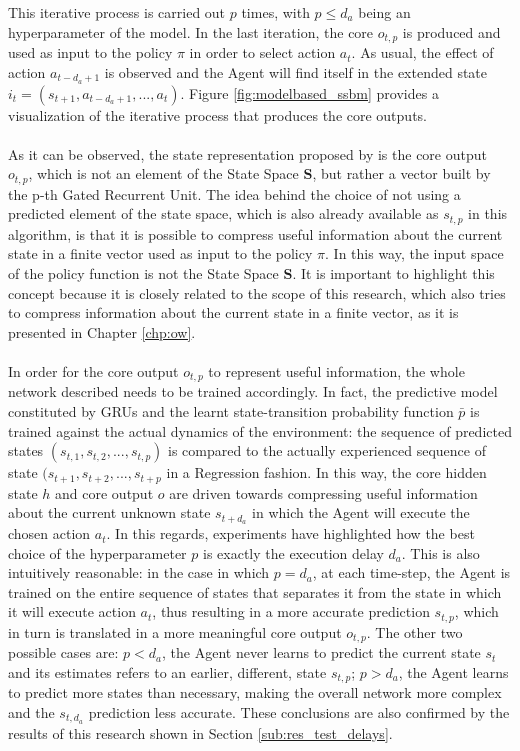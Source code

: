                 This iterative process is carried out $p$ times, with $p \leq d_a$ being an hyperparameter of the model. In the last iteration, the core $o_{t, p}$ is produced and used as input to the policy $\pi$ in order to select action $a_t$. As usual, the effect of action $a_{t-d_a+1}$ is observed and the Agent will find itself in the extended state $i_t = \left( s_{t+1}, a_{t-d_a+1},..., a_{t}\right)$. Figure \ref{fig:modelbased_ssbm} provides a visualization of the iterative process that produces the core outputs.
                \\\\
                As it can be observed, the state representation proposed by  is the core output $o_{t,p}$, which is not an element of the State Space $\mathbf{S}$, but rather a vector built by the p-th Gated Recurrent Unit. The idea behind the choice of not using a predicted element of the state space, which is also already available as $s_{t,p}$ in this algorithm, is that it is possible to compress useful information about the current state in a finite vector used as input to the policy $\pi$. In this way, the input space of the policy function is not the State Space $\mathbf{S}$. \newline
                It is important to highlight this concept because it is closely related to the scope of this research, which also tries to compress information about the current state in a finite vector, as it is presented in Chapter \ref{chp:ow}.
                \\\\
                In order for the core output $o_{t,p}$ to represent useful information, the whole network described needs to be trained accordingly. In fact, the predictive model constituted by GRUs and the learnt state-transition probability function $\bar{p}$ is trained against the actual dynamics of the environment: the sequence of predicted states $(s_{t, 1}, s_{t, 2}, ..., s_{t, p})$ is compared to the actually experienced sequence of state $(s_{t+1}, s_{t+2}, ..., s_{t+p}$ in a Regression fashion. In this way, the core hidden state $h$ and core output $o$ are driven towards compressing useful information about the current unknown state $s_{t+d_a}$ in which the Agent will execute the chosen action $a_t$. In this regards, experiments have highlighted how the best choice of the hyperparameter $p$ is exactly the execution delay $d_a$. This is also intuitively reasonable: in the case in which $p = d_a$, at each time-step, the Agent is trained on the entire sequence of states that separates it from the state in which it will execute action $a_t$, thus resulting in a more accurate prediction $s_{t, p}$, which in turn is translated in a more meaningful core output $o_{t, p}$. The other two possible cases are: $p < d_a$, the Agent never learns to predict the current state $s_t$ and its estimates refers to an earlier, different, state $s_{t,p}$; $p > d_a$, the Agent learns to predict more states than necessary, making the overall network more complex and the $s_{t, d_a}$ prediction less accurate. These conclusions are also confirmed by the results of this research shown in Section \ref{sub:res_test_delays}.
                
